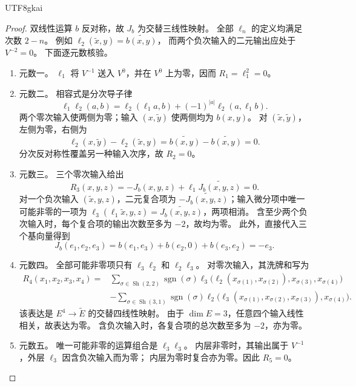 \documentclass[12pt,a4paper,openany,notitlepage]{report}
\theoremstyle{plain}
\theoremstyle{definition}
\theoremstyle{remark}
\def\mathcal#1{#1}\def\mathsf#1{#1}\def\mathbb#1{#1}%
\begin{document}
\begin{CJK*}{UTF8}{gkai}
\begin{proof}
双线性运算 $b$ 反对称，故 $J_b$ 为交替三线性映射。
全部 $\ell_n$ 的定义均满足次数 $2-n$。
例如 $\ell_2(\widetilde x,y)=\widetilde{b(x,y)}$，
而两个负次输入的二元输出应处于 $V^{-2}=0$。
下面逐元数核验。

\begin{enumerate}
\item 元数一。
$\ell_1$ 将 $V^{-1}$ 送入 $V^0$，并在 $V^0$ 上为零，因而
$\mathcal R_1=\ell_1^2=0$。

\item 元数二。
相容式是分次导子律
\[
\ell_1\ell_2(a,b)
=\ell_2(\ell_1a,b)+(-1)^{|a|}\ell_2(a,\ell_1b).
\]
两个零次输入使两侧为零；输入 $(x,\widetilde y)$ 使两侧均为 $b(x,y)$。
对 $(\widetilde x,\widetilde y)$，左侧为零，右侧为
\[
\ell_2(x,\widetilde y)-\ell_2(\widetilde x,y)
=\widetilde{b(x,y)}-\widetilde{b(x,y)}=0.
\]
分次反对称性覆盖另一种输入次序，故 $\mathcal R_2=0$。

\item 元数三。
三个零次输入给出
\[
\mathcal R_3(x,y,z)=-J_b(x,y,z)+\ell_1\widetilde{J_b(x,y,z)}=0.
\]
对一个负次输入 $(\widetilde x,y,z)$，二元复合项为
$-\widetilde{J_b(x,y,z)}$；输入微分项中唯一可能非零的一项为
$\ell_3(\ell_1\widetilde x,y,z)=\widetilde{J_b(x,y,z)}$，两项相消。
含至少两个负次输入时，每个复合项的输出次数至多为 $-2$，故均为零。
此外，直接代入三个基向量得到
\[
J_b(e_1,e_2,e_3)
=b(e_1,e_3)+b(e_2,0)+b(e_3,e_2)=-e_3.
\]

\item 元数四。
全部可能非零项只有 $\ell_3\ell_2$ 和 $\ell_2\ell_3$。
对零次输入，其洗牌和写为
\[
\begin{aligned}
\mathcal R_4(x_1,x_2,x_3,x_4)
={}&\sum_{\sigma\in\operatorname{Sh}(2,2)}
\operatorname{sgn}(\sigma)
\ell_3\bigl(\ell_2(x_{\sigma(1)},x_{\sigma(2)}),
x_{\sigma(3)},x_{\sigma(4)}\bigr)\\
&-\sum_{\sigma\in\operatorname{Sh}(3,1)}
\operatorname{sgn}(\sigma)
\ell_2\bigl(\ell_3(x_{\sigma(1)},x_{\sigma(2)},x_{\sigma(3)}),
x_{\sigma(4)}\bigr).
\end{aligned}
\]
该表达是 $E^4\to\widetilde E$ 的交替四线性映射。
由于 $\dim E=3$，任意四个输入线性相关，故表达为零。
含负次输入时，各复合项的总次数至多为 $-2$，亦为零。

\item 元数五。
唯一可能非零的运算组合是 $\ell_3\ell_3$。
内层非零时，其输出属于 $V^{-1}$，外层 $\ell_3$ 因含负次输入而为零；
内层为零时复合亦为零。因此 $\mathcal R_5=0$。


\end{enumerate}
\end{proof}
\end{CJK*}
\end{document}
